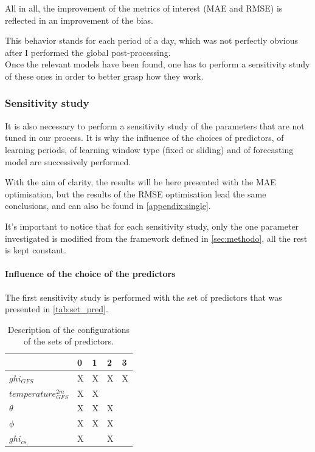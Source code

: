 All in all, the improvement of the metrics of interest (MAE and RMSE) is reflected in an improvement of the bias. 

This behavior stands for each period of a day, which was not perfectly obvious after I performed the global post-processing.\\

Once the relevant models have been found, one has to perform a sensitivity study of these ones in order to better grasp how they work.

\subsubsection{Sensitivity study}
It is also necessary to perform a sensitivity study of the parameters that are not tuned in our process. It is why the influence of the choices of predictors, of learning periods, of learning window type (fixed or sliding) and of forecasting model are successively performed. 

With the aim of clarity, the results will be here presented with the MAE optimisation, but the results of the RMSE optimisation lead the same conclusions, and can also
be found in \autoref{appendix:single}.

It's important to notice that for each sensitivity study, only the one parameter investigated is modified from the framework defined in \autoref{sec:methodo}, all the rest is kept constant.

\paragraph{Influence of the choice of the predictors}
\indent

The first sensitivity study is performed with the set of predictors that was presented in \autoref{tab:set_pred}.
\begin{table}[htb!]
\begin{center}
\begin{tabular}{|l|llll|}
\toprule
{} &  0 &  1 &  2 &  3 \\
\midrule
$ghi_{GFS}$            &  X &  X &  X &  X \\
$temperature^{2m}_{GFS}$ &  X &  X &    &    \\
$\theta$             &  X &  X &  X &    \\
$\phi$            &  X &  X &  X &    \\
$ghi_{cs}$             &  X &    &  X &    \\
\bottomrule
\end{tabular}
\end{center}
\label{tab:pred_configs}
\caption{Description of the configurations of the sets of predictors.}
\end{table}

